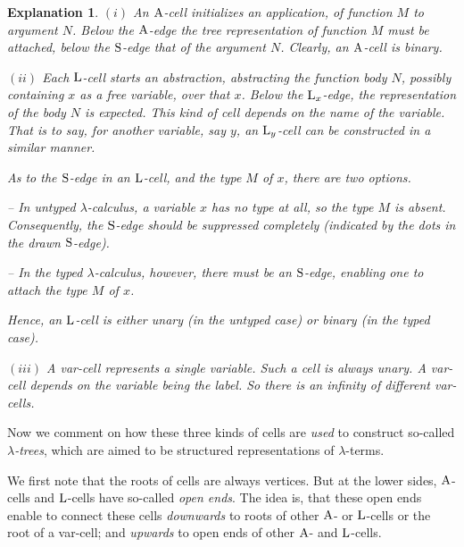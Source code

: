 \documentclass{article}
\theoremstyle{plain}
\newtheorem{Exp}[The]{Explanation}
\theoremstyle{definition}
\begin{document}
\begin{Exp}

$(i)$ An {\em ${\rm A}$-cell\/} initializes an {\em application\/}, of {\em function\/} $M$ to {\em argument\/} $N$. Below the ${\rm A}$-edge the tree representation of function $M$ must be attached, below the ${\rm S}$-edge that of the argument $N$.
Clearly, an ${\rm A}$-cell is {\em binary\/}.

$(ii)$  Each {\em ${\rm L}$-cell\/} starts an {\em abstraction\/}, abstracting the {\em function body\/} $N$, possibly containing $x$ as a free variable, over that $x$. Below the ${\rm L}_x$-edge, the representation of the body $N$ is expected. This kind of cell depends on the name of the variable. That is to say, for another variable, say $y$, an ${\rm L}_y$-cell can be constructed in a similar manner.

As to the ${\rm S}$-edge in an ${\rm L}$-cell, and the {\em type\/} $M$ of $x$, there are two options.

-- In {\em untyped\/} $\lambda$-calculus, a variable $x$ has no type at all, so the type $M$ is absent. Consequently, the ${\rm S}$-edge should be suppressed completely (indicated by the dots in the drawn ${\rm S}$-edge).

-- In the {\em typed\/} $\lambda$-calculus, however, there must be an ${\rm S}$-edge, enabling one to attach the type $M$ of $x$.

Hence, an ${\rm L}$-cell is either unary (in the untyped case) or binary (in the typed case).

$(iii)$ A {\em var-cell\/} represents a single variable. Such a cell is always unary. A var-cell depends on the variable being the label. So there is an infinity of different var-cells.

\end{Exp}

Now we comment on how these three kinds of cells are {\em used\/} to construct so-called {\em $\lambda$-trees\/}, which are aimed to be structured representations of $\lambda$-terms.

We first note that the roots of cells are always vertices. But at the lower sides, ${\rm A}$-cells and ${\rm L}$-cells have so-called {\em open ends\/}. The idea is, that these open ends enable to connect these cells {\em downwards\/} to roots of other ${\rm A}$- or ${\rm L}$-cells or the root of a var-cell; and {\em upwards\/} to open ends of other ${\rm A}$- and ${\rm L}$-cells.
\end{document}
